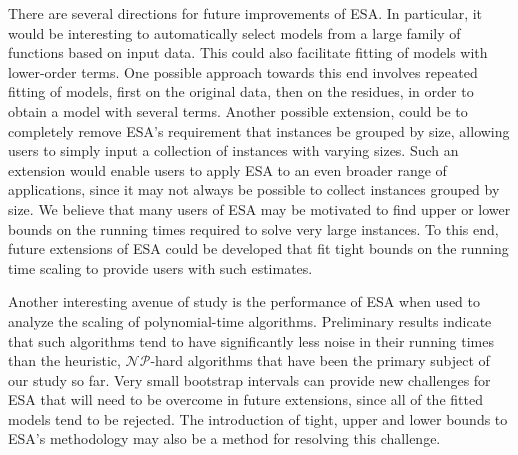 \documentclass[aic]{iosart2x}
\begin{document}
There are several directions for future improvements of ESA. In particular, it would be interesting to automatically select models from a large family of functions based on input data. This could also facilitate fitting of models with lower-order terms. One possible approach towards this end involves repeated fitting of models, first on the original data, then on the residues, in order to obtain a model with several terms. %
Another possible extension, could be to completely remove ESA's requirement that instances be grouped by size, allowing users to simply input a collection of instances with varying sizes. Such an extension would enable users to apply ESA to an even broader range of applications, since it may not always be possible to collect instances grouped by size. We believe that many users of ESA may be motivated to find upper or lower bounds on the running times required to solve very large instances. To this end, future extensions of ESA could be developed that fit tight bounds on the running time scaling to provide users with such estimates.

Another interesting avenue of study is the performance of ESA when used to analyze the scaling of polynomial-time algorithms. Preliminary results indicate that such algorithms tend to have significantly less noise in their running times than the heuristic, $\mathcal{NP}$-hard algorithms that have been the primary subject of our study so far. Very small bootstrap intervals can provide new challenges for ESA that will need to be overcome in future extensions, since all of the fitted models tend to be rejected. The introduction of tight, upper and lower bounds to ESA's methodology may also be a method for resolving this challenge.
\end{document}
